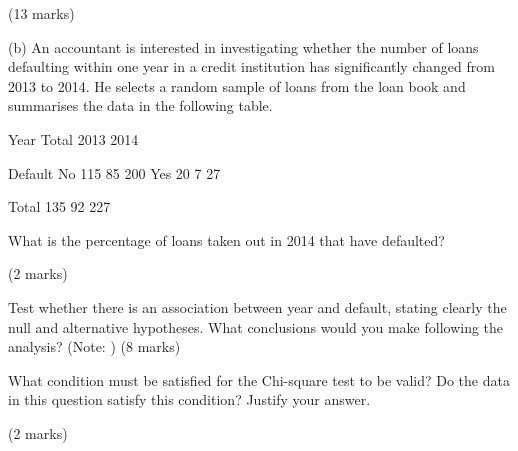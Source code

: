 (13 marks)

(b) An accountant is interested in investigating whether the number of loans defaulting within one year in a credit institution has significantly changed from 2013 to 2014. He selects a random sample of loans from the loan book and summarises the data in the following table.

Year Total 2013 2014

Default No 115 85 200 Yes 20 7 27

Total 135 92 227

\item[(i)] What is the percentage of loans taken out in 2014 that have defaulted?

(2 marks)

\item[(ii)] Test whether there is an association between year and default, stating clearly the null and alternative hypotheses. What conclusions would you make following the analysis? (Note: ) (8 marks)

\item[(iii)] What condition must be satisfied for the Chi-square test to be valid? Do the data in this question satisfy this condition? Justify your answer.

(2 marks)

